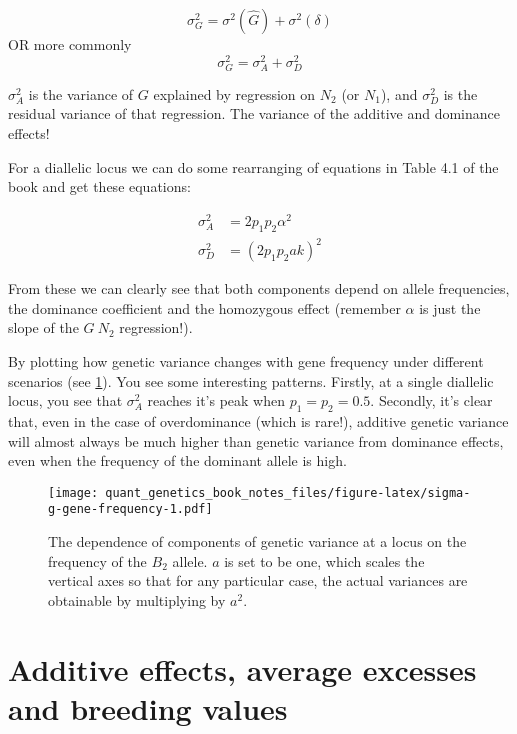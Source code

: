 \documentclass[
]{book}
\begin{document}
\[ \sigma^2_G = \sigma^2(\hat{G}) + \sigma^2(\delta) \]
OR more commonly
\begin{equation}
  \sigma^2_G = \sigma^2_A + \sigma^2_D
  \label{eq:genetic-variance-one-locus}
\end{equation}

\(\sigma^2_A\) is the variance of \(G\) explained by regression on \(N_2\) (or \(N_1\)), and \(\sigma^2_D\) is the residual variance of that regression. The variance of the additive and dominance effects!

For a diallelic locus we can do some rearranging of equations in Table 4.1 of the book and get these equations:

\begin{align}
  \sigma^2_A &= 2p_1p_2\alpha^2 \label{eq:additive-var} \\
  \sigma^2_D &= (2p_1p_2ak)^2 \label{eq:dominance-var}
\end{align}

From these we can clearly see that both components depend on allele frequencies, the dominance coefficient and the homozygous effect (remember \(\alpha\) is just the slope of the \(G ~ N_2\) regression!).

By plotting how genetic variance changes with gene frequency under different scenarios (see \ref{fig:sigma-g-gene-frequency}). You see some interesting patterns. Firstly, at a single diallelic locus, you see that \(\sigma^2_A\) reaches it's peak when \(p_1 = p_2 = 0.5\). Secondly, it's clear that, even in the case of overdominance (which is rare!), additive genetic variance will almost always be much higher than genetic variance from dominance effects, even when the frequency of the dominant allele is high.



\begin{figure}
\centering
\texttt{[image: quant\_genetics\_book\_notes\_files/figure-latex/sigma-g-gene-frequency-1.pdf]}
\caption{\label{fig:sigma-g-gene-frequency}The dependence of components of genetic variance at a locus on the frequency of the \(B_2\) allele. \(a\) is set to be one, which scales the vertical axes so that for any particular case, the actual variances are obtainable by multiplying by \(a^2\).}
\end{figure}

\hypertarget{additive-effects-average-excesses-and-breeding-values}{%
\section{Additive effects, average excesses and breeding values}\label{additive-effects-average-excesses-and-breeding-values}}
\end{document}
